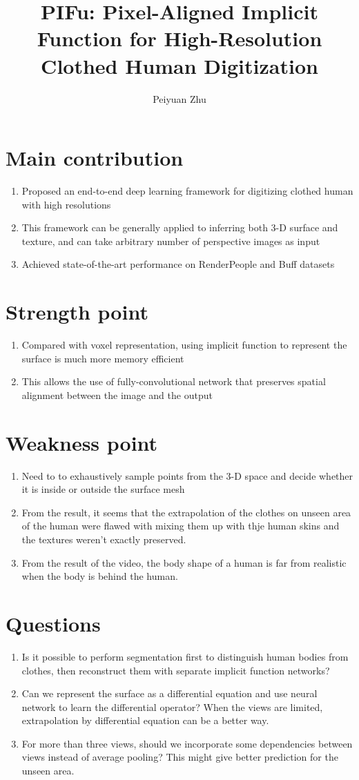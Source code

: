 \documentclass{article}
\author{Peiyuan Zhu}
\title{PIFu: Pixel-Aligned Implicit Function for High-Resolution Clothed Human Digitization}
\begin{document}
	\maketitle
	\section{Main contribution}
	\begin{enumerate}
		\item Proposed an end-to-end deep learning framework for digitizing clothed human with high resolutions
		\item This framework can be generally applied to inferring both 3-D surface and texture, and can take arbitrary number of perspective images as input
		\item Achieved state-of-the-art performance on RenderPeople and Buff datasets
	\end{enumerate}
	\section{Strength point}
	\begin{enumerate}
		\item Compared with voxel representation, using implicit function to represent the surface is much more memory efficient 
		\item This allows the use of fully-convolutional network that preserves spatial alignment between the image and the output
	\end{enumerate}
	\section{Weakness point}
	\begin{enumerate}
		\item Need to to exhaustively sample points from the 3-D space and decide whether it is inside or outside the surface mesh
		\item From the result, it seems that the extrapolation of the clothes on unseen area of the human were flawed with mixing them up with thje human skins and the textures weren't exactly preserved. 
		\item From the result of the video, the body shape of a human is far from realistic when the body is behind the human.
	\end{enumerate}
	\section{Questions}
	\begin{enumerate}
		\item Is it possible to perform segmentation first to distinguish human bodies from clothes, then reconstruct them with separate implicit function networks?
		\item Can we represent the surface as a differential equation and use neural network to learn the differential operator? When the views are limited, extrapolation by differential equation can be a better way.
		\item For more than three views, should we incorporate some dependencies between views instead of average pooling? This might give better prediction for the unseen area.
	\end{enumerate}
\end{document}
